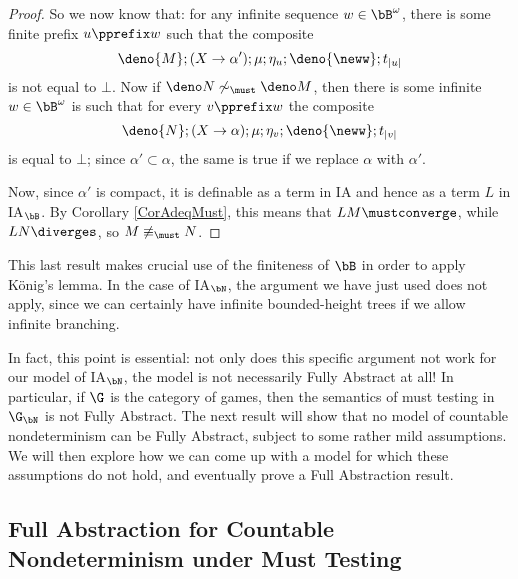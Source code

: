 \begin{proof}
  So we now know that: for any infinite sequence $w\in \bB^\omega$, there is some finite prefix $u\pprefix w$ such that the composite
  \[
    \deno{M};(X \to \alpha');\mu;\eta_u;\deno{\neww};t_{|u|}
    \]
  is not equal to $\bot$.  
  Now if $\deno N\not\sim_{\must}\deno M$, then there is some infinite $w\in \bB^\omega$ is such that for every $v\pprefix w$ the composite
  \[
    \deno{N};(X \to \alpha);\mu;\eta_v;\deno{\neww};t_{|v|}
    \]
  is equal to $\bot$; since $\alpha'\subset \alpha$, the same is true if we replace $\alpha$ with $\alpha'$.

  Now, since $\alpha'$ is compact, it is definable as a term in IA and hence as a term $L$ in IA${}_\bB$.  
  By Corollary \ref{CorAdeqMust}, this means that $L M \mustconverge$, while $L N\diverges$, so $M\not\equiv_{\must}N$.
\end{proof}

This last result makes crucial use of the finiteness of $\bB$ in order to apply K\"{o}nig's lemma.  
In the case of IA${}_\bN$, the argument we have just used does not apply, since we can certainly have infinite bounded-height trees if we allow infinite branching.

In fact, this point is essential: not only does this specific argument not work for our model of IA${}_\bN$, the model is not necessarily Fully Abstract at all! 
In particular, if $\G$ is the category of games, then the semantics of must testing in $\G_{\bN}$ is not Fully Abstract.
The next result will show that no model of countable nondeterminism can be Fully Abstract, subject to some rather mild assumptions.  
We will then explore how we can come up with a model for which these assumptions do not hold, and eventually prove a Full Abstraction result.

\subsection{Full Abstraction for Countable Nondeterminism under Must Testing}

